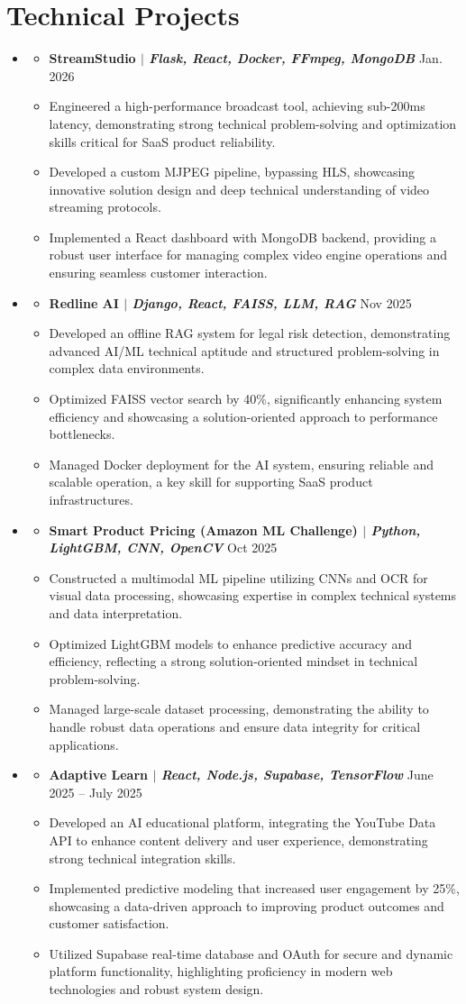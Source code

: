 \documentclass[letterpaper,11pt]{article}
\newcommand{\resumeItem}[1]{
  \item\small{
    {#1 \vspace{-2pt}}
  }
}
\newcommand{\resumeProjectHeading}[2]{
    \item
    \begin{itemize}[leftmargin=0in, label={}]
        \item
      \small\textbf{#1} \hfill #2 \\
    \end{itemize}\vspace{-6pt}
}
\newcommand{\resumeSubHeadingListStart}{\begin{itemize}[leftmargin=0.15in, label={}, itemsep=-1pt]}
\newcommand{\resumeSubHeadingListEnd}{\end{itemize}}
\newcommand{\resumeItemListStart}{\begin{itemize}[itemsep=0pt]}
\newcommand{\resumeItemListEnd}{\end{itemize}\vspace{-5pt}}
\begin{document}
\section{Technical Projects}
    \resumeSubHeadingListStart
         \resumeProjectHeading
    {StreamStudio $|$ \emph{Flask, React, Docker, FFmpeg, MongoDB}}{Jan. 2026}
    \resumeItemListStart
        \resumeItem{Engineered a high-performance broadcast tool, achieving sub-200ms latency, demonstrating strong technical problem-solving and optimization skills critical for SaaS product reliability.}\resumeItem{Developed a custom MJPEG pipeline, bypassing HLS, showcasing innovative solution design and deep technical understanding of video streaming protocols.}\resumeItem{Implemented a React dashboard with MongoDB backend, providing a robust user interface for managing complex video engine operations and ensuring seamless customer interaction.}
    \resumeItemListEnd
    
      \resumeProjectHeading
          {Redline AI $|$ \emph{Django, React, FAISS, LLM, RAG}}{Nov 2025}
          \resumeItemListStart
            \resumeItem{Developed an offline RAG system for legal risk detection, demonstrating advanced AI/ML technical aptitude and structured problem-solving in complex data environments.}\resumeItem{Optimized FAISS vector search by 40\%, significantly enhancing system efficiency and showcasing a solution-oriented approach to performance bottlenecks.}\resumeItem{Managed Docker deployment for the AI system, ensuring reliable and scalable operation, a key skill for supporting SaaS product infrastructures.}
          \resumeItemListEnd

      \resumeProjectHeading
    {\textbf{Smart Product Pricing (Amazon ML Challenge)} $|$ \emph{Python, LightGBM, CNN, OpenCV}}{Oct 2025}
    \resumeItemListStart
        \resumeItem{Constructed a multimodal ML pipeline utilizing CNNs and OCR for visual data processing, showcasing expertise in complex technical systems and data interpretation.}\resumeItem{Optimized LightGBM models to enhance predictive accuracy and efficiency, reflecting a strong solution-oriented mindset in technical problem-solving.}\resumeItem{Managed large-scale dataset processing, demonstrating the ability to handle robust data operations and ensure data integrity for critical applications.}
    \resumeItemListEnd
    
      \resumeProjectHeading
          {Adaptive Learn $|$ \emph{React, Node.js, Supabase, TensorFlow}}{June 2025 -- July 2025}
          \resumeItemListStart
            \resumeItem{Developed an AI educational platform, integrating the YouTube Data API to enhance content delivery and user experience, demonstrating strong technical integration skills.}\resumeItem{Implemented predictive modeling that increased user engagement by 25\%, showcasing a data-driven approach to improving product outcomes and customer satisfaction.}\resumeItem{Utilized Supabase real-time database and OAuth for secure and dynamic platform functionality, highlighting proficiency in modern web technologies and robust system design.}
          \resumeItemListEnd
    \resumeSubHeadingListEnd
\end{document}
